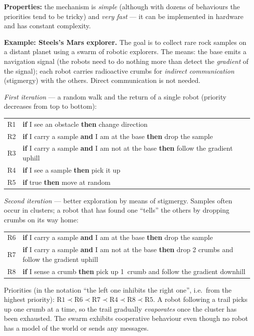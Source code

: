 \documentclass[11pt,a4paper]{article}
\theoremstyle{definition}
\providecommand{\uv}[1]{``#1''}
\begin{document}
\textbf{Properties:} the mechanism is \emph{simple} (although with dozens of behaviours the
priorities tend to be tricky) and \emph{very fast} --- it can be implemented in hardware and has
constant complexity.

\medskip
\noindent\textbf{Example: Steels's Mars explorer.}
The goal is to collect rare rock samples on a distant planet using a swarm of robotic explorers.
The means: the base emits a navigation signal (the robots need to do nothing more than detect the
\emph{gradient} of the signal); each robot carries radioactive crumbs for \emph{indirect
communication} (stigmergy) with the others. Direct communication is not needed.

\emph{First iteration} --- a random walk and the return of a single robot (priority decreases from
top to bottom):
\begin{center}\small
\begin{tabular}{ll}
\toprule
R1 & \textbf{if} I see an obstacle \textbf{then} change direction \\
R2 & \textbf{if} I carry a sample \textbf{and} I am at the base \textbf{then} drop the sample \\
R3 & \textbf{if} I carry a sample \textbf{and} I am not at the base \textbf{then} follow the gradient uphill \\
R4 & \textbf{if} I see a sample \textbf{then} pick it up \\
R5 & \textbf{if} true \textbf{then} move at random \\
\bottomrule
\end{tabular}
\end{center}

\emph{Second iteration} --- better exploration by means of stigmergy. Samples often occur in
clusters; a robot that has found one \uv{tells} the others by dropping crumbs on its way home:
\begin{center}\small
\begin{tabular}{ll}
\toprule
R6 & \textbf{if} I carry a sample \textbf{and} I am at the base \textbf{then} drop the sample \\
R7 & \textbf{if} I carry a sample \textbf{and} I am not at the base \textbf{then} drop 2 crumbs
     and follow the gradient uphill \\
R8 & \textbf{if} I sense a crumb \textbf{then} pick up 1~crumb and follow the gradient downhill \\
\bottomrule
\end{tabular}
\end{center}
Priorities (in the notation \uv{the left one inhibits the right one}, i.e.\ from the highest
priority): $\mathrm{R1} \prec \mathrm{R6} \prec \mathrm{R7} \prec \mathrm{R4} \prec
\mathrm{R8} \prec \mathrm{R5}$. A robot following a trail picks up one crumb at a time, so the trail
gradually \emph{evaporates} once the cluster has been exhausted. The swarm exhibits cooperative
behaviour even though no robot has a model of the world or sends any messages.
\end{document}

